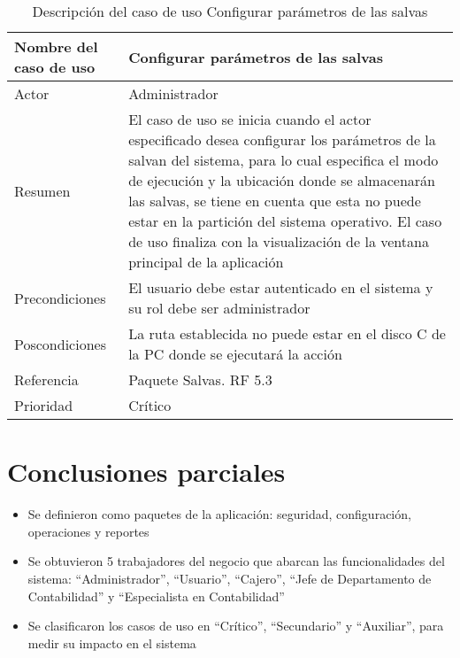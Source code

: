 \begin{table}[H]
	\sf
	\begin{supertabular}{|p{4.5cm}|p{12cm}|}
		\hline
		\textbf{Nombre del caso de uso}
		& \textbf{Configurar parámetros de las salvas} \\ \hline
		
		Actor
		& Administrador \\ \hline
		
		Resumen
		& El caso de uso se inicia cuando el actor especificado desea configurar los parámetros de la salvan del sistema, para lo cual especifica el modo de ejecución y la ubicación donde se almacenarán las salvas, se tiene en cuenta que esta no puede estar en la partición del sistema operativo. El caso de uso finaliza con la visualización de la ventana principal de la aplicación \\ \hline
		
		Precondiciones
		& El usuario debe estar autenticado en el sistema y su rol debe ser administrador \\ \hline
		
		Poscondiciones
		& La ruta establecida no puede estar en el disco C de la PC donde se ejecutará la acción \\ \hline
		
		Referencia
		& Paquete Salvas. RF 5.3 \\ \hline
		
		Prioridad
		& Crítico \\		
		\hline
	\end{supertabular}
	\caption[Descripción del caso de uso Configurar parámetros de las salvas]{Descripción del caso de uso Configurar parámetros de las salvas}
	\label{table:CU_ConfigPSalva}
\end{table}

\section{Conclusiones parciales}
\begin{itemize}
	\item Se definieron como paquetes de la aplicación: seguridad, configuración,	operaciones y reportes
	\item Se obtuvieron 5 trabajadores del negocio que abarcan las funcionalidades	del sistema: “Administrador”, “Usuario”, “Cajero”, “Jefe de Departamento	de Contabilidad” y “Especialista en Contabilidad”
	\item Se clasificaron los casos de uso en “Crítico”, “Secundario” y “Auxiliar”,	para medir su impacto en el sistema
\end{itemize}